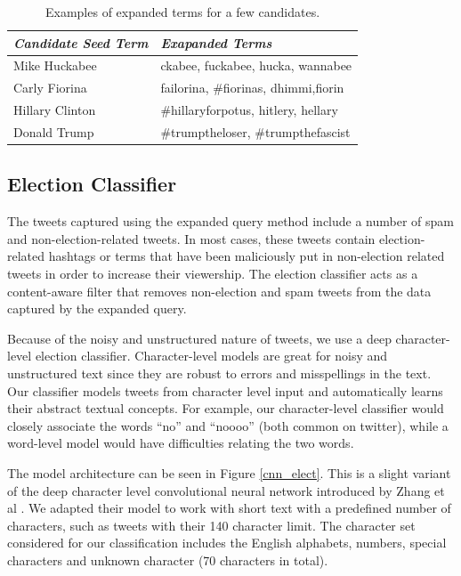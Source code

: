 \documentclass[letterpaper]{article}
\begin{document}
\begin{table}[h]
\centering
\small
\begin{tabular}{|l|l|}
\hline %
\emph{Candidate Seed Term} & \emph{Exapanded Terms} \\\hline
Mike Huckabee & ckabee, fuckabee, hucka, wannabee \\\hline
Carly Fiorina & failorina, \#fiorinas, dhimmi,fiorin\\\hline
Hillary Clinton &  \#hillaryforpotus, hitlery, hellary \\\hline
Donald Trump &  \#trumptheloser, \#trumpthefascist \\\hline
\end{tabular}
\caption{Examples of expanded terms for a few candidates.}
\label{tab:expand_1}
\end{table}




\subsection{Election Classifier}
The tweets captured using the expanded query method include a number of spam and non-election-related tweets. In most cases, these tweets contain election-related hashtags or terms that have been maliciously put in non-election related tweets in order to increase their viewership. The election classifier acts as a content-aware filter that removes non-election and spam tweets from the data captured by the expanded query.

Because of the noisy and unstructured nature of tweets, we use a deep character-level election classifier. Character-level models are great for noisy and unstructured text since they are robust to errors and misspellings in the text. Our classifier models tweets from character level input and automatically learns their abstract textual concepts. For example, our character-level classifier would closely associate the words ``no'' and ``noooo'' (both common on twitter), while a word-level model would have difficulties relating the two words.

The model architecture can be seen in Figure \ref{cnn_elect}. This is a slight variant of the deep character level convolutional neural network introduced by Zhang et al \cite{zhang2015text}. We adapted their model to work with short text with a predefined number of characters, such as tweets with their 140 character limit. The character set considered for our classification includes the English alphabets, numbers, special characters and unknown character (70 characters in total). %
\end{document}

